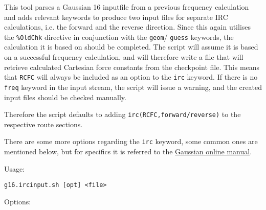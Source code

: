 \documentclass[   %
  final,          %
  a4paper         %
]{article}
\begin{document}
This tool parses a Gaussian 16 inputfile from a previous frequency calculation and 
adds relevant keywords to produce two input files for separate IRC calculations, 
i.e. the forward and the reverse direction.
Since this again utilises the \texttt{\%OldChk} directive in conjunction with 
the \texttt{geom}/ \texttt{guess} keywords, the calculation it is based on should be completed.
The script will assume it is based on a successful frequency calculation, 
and will therefore write a file that will retrieve calculated Cartesian force constants from the checkpoint file.
This means that \texttt{RCFC} will always be included as an option to the \texttt{irc} keyword.
If there is no \texttt{freq} keyword in the input stream, the script will issue a warning,
and the created input files should be checked manually.

Therefore the script defaults to adding \texttt{irc(RCFC,forward/reverse)} to the respective route sections.

There are some more options regarding the \texttt{irc} keyword, some common ones are mentioned below,
but for specifics it is referred to the \href{http://gaussian.com/irc/}{Gaussian online manual}.

Usage: 

\lstinline`g16.ircinput.sh [opt] <file>`

Options:
\end{document}
